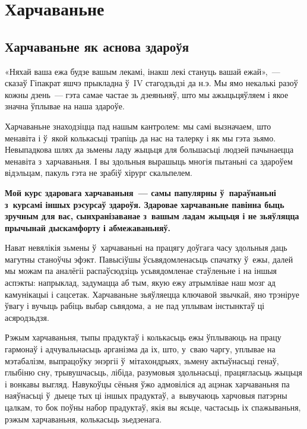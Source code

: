\chapter{Харчаваньне}

\section{Харчаваньне як аснова здароўя}

«Няхай ваша ежа будзе вашым лекамі, інакш лекі стануць вашай ежай»,~--- сказаў Гіпакрат яшчэ прыкладна ў~IV стагодзьдзі да н.э. Мы ямо некалькі разоў кожны дзень~--- гэта самае частае зь дзеяньняў, што мы ажыцьцяўляем і якое значна ўплывае на наша здароўе. 

Харчаваньне знаходзіцца пад нашым кантролем: мы самі вызначаем, што менавіта і ў~якой колькасьці трапіць да нас на талерку і як мы гэта зьямо. Невыпадкова шлях да зьмены ладу жыцьця для большасьці людзей пачынаецца менавіта з~харчаваньня. І вы здольныя вырашыць многія пытаньні са здароўем відэльцам, пакуль гэта не зрабіў хірург скальпелем. 

\textbf{Мой курс здаровага харчаваньня~--- самы папулярны ў~параўнаньні з~курсамі іншых рэсурсаў здароўя. Здаровае харчаваньне павінна быць зручным для вас, сынхранізаванае з~вашым ладам жыцьця і не зьяўляцца прычынай дыскамфорту і абмежаваньняў.} 


Нават невялікія зьмены ў~харчаваньні на працягу доўгага часу здольныя даць магутны станоўчы эфэкт. Павысіўшы ўсьвядомленасьць спачатку ў~ежы, далей мы можам па аналёгіі распаўсюдзіць усьвядомленае стаўленьне і на іншыя аспэкты: напрыклад, задумацца аб тым, якую ежу атрымлівае наш мозг ад камунікацыі і сацсетак. Харчаваньне зьяўляецца ключавой звычкай, яно трэніруе ўвагу і вучыць рабіць выбар сьвядома, а~не пад уплывам інстынктаў ці асяродзьдзя.

Рэжым харчаваньня, тыпы прадуктаў і колькасьць ежы ўплываюць на працу гармонаў і адчувальнасьць арганізма да іх, што, у~сваю чаргу, уплывае на мэтабалізм, выпрацоўку энэргіі ў~мітахондрыях, зьмену актыўнасьці генаў, глыбіню сну, трывушчасьць, лібіда, разумовыя здольнасьці, працягласьць жыцьця і вонкавы выгляд. Навукоўцы сёньня ўжо адмовіліся ад ацэнак харчаваньня па наяўнасьці ў~дыеце тых ці іншых прадуктаў, а~вывучаюць харчовыя патэрны цалкам, то бок поўны набор прадуктаў, якія вы ясьце, частасьць іх спажываньня, рэжым харчаваньня, колькасьць зьедзенага.

